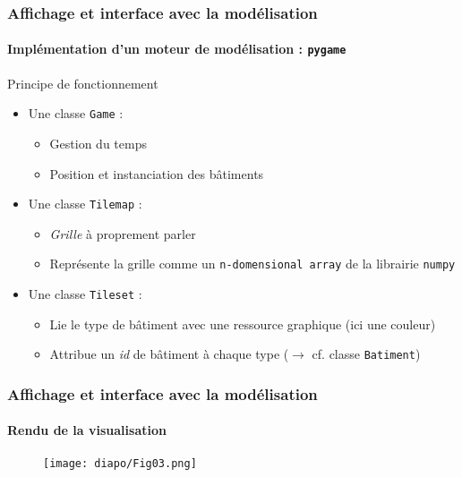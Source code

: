 \begin{frame}
	\frametitle{Affichage et interface avec la modélisation}
	\framesubtitle{Implémentation d'un moteur de modélisation : \texttt{pygame}}

	\begin{block}{Principe de fonctionnement}
	    \pause
        \begin{itemize}
            \item Une classe \texttt{Game} : \begin{itemize}
                \item Gestion du temps
                \item Position et instanciation des bâtiments
            \end{itemize}
            \pause
            \item Une classe \texttt{Tilemap} : \begin{itemize}
                \item \textit{Grille} à proprement parler
                \item Représente la grille comme un \texttt{n-domensional array} de la librairie \texttt{numpy}
            \end{itemize}
            \pause
            \item Une classe \texttt{Tileset} : \begin{itemize}
                \item Lie le type de bâtiment avec une ressource graphique (ici une couleur)
                \item Attribue un \textit{id} de bâtiment à chaque type ($\rightarrow$ cf. classe \texttt{Batiment})  
            \end{itemize}
        \end{itemize}
	\end{block}
\end{frame}

\begin{frame}
	\frametitle{Affichage et interface avec la modélisation}
	\framesubtitle{Rendu de la visualisation}

\begin{figure}
\texttt{[image: diapo/Fig03.png]}
\end{figure}

\end{frame}


